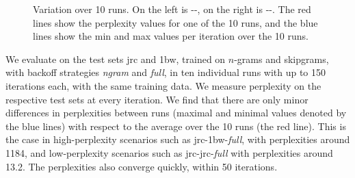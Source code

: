 \begin{figure*}
\caption{Variation over 10 runs. On the left is \jrc-\obw-\BOF, on the right is \jrc-\jrc-\BON. The red lines show the perplexity values for one of the 10 runs, and the blue lines show the min and max values per iteration over the 10 runs.}\label{fig:iterplots}
\end{figure*}


We evaluate on the test sets jrc and 1bw, trained on $n$-grams and skipgrams, with backoff strategies \emph{ngram} and \emph{full}, in ten individual runs with up to 150 iterations each, with the same training data. We measure perplexity on the respective test sets at every iteration. We find that there are only minor differences in perplexities between runs (maximal and minimal values denoted by the blue lines) with respect to the average over the 10 runs (the red line). This is the case in high-perplexity scenarios such as jrc-1bw-\emph{full}, with perplexities around 1184, and low-perplexity scenarios such as jrc-jrc-\emph{full} with perplexities around 13.2. The perplexities also converge quickly, within 50 iterations.
